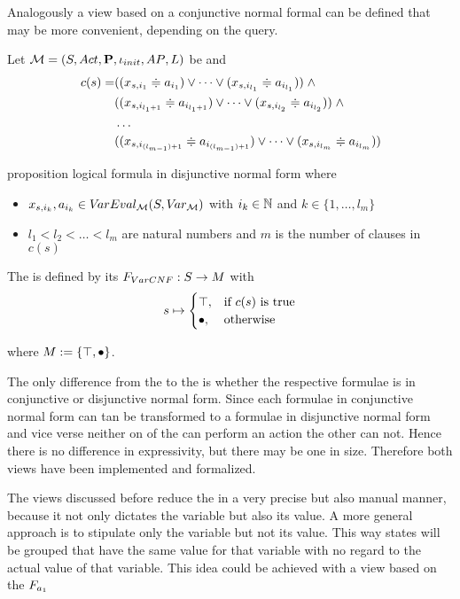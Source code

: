 \documentclass[preview]{standalone}
\begin{document}
Analogously a view based on a conjunctive normal formal can be defined that may be more convenient, depending on the query.

\begin{definition}
	Let $\chgph = \chgphtuple$ be \achgphN and 
	\begin{align*}
		c(s) = &((\varstate[,i_1] \eqorneq \varval_{i_1}) \lor \dots \lor (\varstate[,i_{l_1}] \eqorneq \varval_{i_{l_1}})) \; \land \\
		&((\varstate[,i_{l_1+1}] \eqorneq \varval_{i_{l_1+1}}) \lor \dots \lor (\varstate[,i_{l_2}] \eqorneq \varval_{i_{l_2}})) \; \land  \\
		&\dots \\ 
		&((\varstate[,i_{(l_{m-1})+1}] \eqorneq \varval_{i_{(l_{m-1})+1}}) \lor \dots \lor (\varstate[,i_{l_m}]  \eqorneq \varval_{i_{l_m}}))
	\end{align*}
	
	proposition logical formula in disjunctive normal form where
	\begin{itemize}
			\item $\varstate[,i_k], a_{i_k} \in \varevalimg$ with $i_k\in \natnums$ and $k \in \{1, \dots, l_m\}$
			\item $l_1 < l_2 < \dots < l_m$ are natural numbers and $m$ is the number of clauses in $c(s)$
	\end{itemize}
	The \viewN \viewparamcnf is defined by its \grpfctN $\gfctparamcnf : \states \to \imggrp$ with
	\[
	\state \mapsto
	\begin{cases}
			\group, &\text{if } c(s) \text{ is true}\\
			\remelem, 	&\text{otherwise}
		\end{cases}
	\]
	
	where $\imggrp := \{\group, \remelem\}$.
\end{definition}

The only difference from the \viewN \viewparamcnf to the \viewN \viewparamdnf is whether the respective formulae is in conjunctive or disjunctive normal form. Since each formulae in conjunctive normal form can tan be transformed to a formulae in disjunctive normal form and vice verse neither on of the \viewsN can perform an action the other can not. Hence there is no difference in expressivity, but there may be one in size. Therefore both views have been implemented and formalized. 

The views discussed before reduce the \chgphN in a very precise but also manual manner, because it not only dictates the variable but also its value. A more general approach is to stipulate only the variable but not its value. This way states will be grouped that have the same value for that variable with no regard to the actual value of that variable. This idea could be achieved with a view based on the \grpfctN $\grpfct[\varval_1 ]$%
\end{document}

